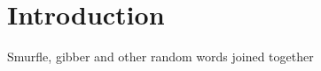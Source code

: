 
\section{Introduction}
\label{sec:review:introduction}

Smurfle, gibber and other random words joined together




